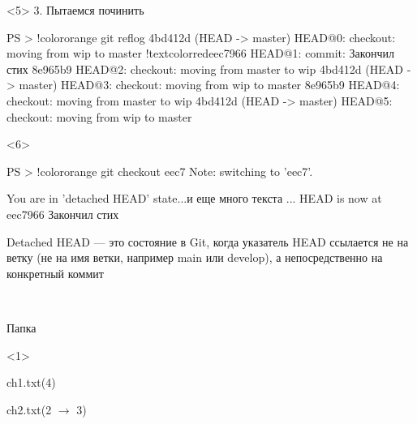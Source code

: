 \documentclass[9pt, aspectratio=1610]{beamer}
\begin{document}
\begin{frame}[t,fragile]
\begin{columns}[onlytextwidth]
\begin{column}[T]{\linewidth}
\begin{minipage}[t][5.2cm][t]{\textwidth}
				\begin{onlyenv}<5>
					3. Пытаемся починить
					
					\begin{VerbatimCmd}[gobble=6]
						
						PS > !color{orange} git reflog
						4bd412d (HEAD -> master) HEAD@{0}: checkout: moving from wip to master
						!textcolor{red}{eec7966} HEAD@{1}: commit: Закончил стих
						8e965b9 HEAD@{2}: checkout: moving from master to wip
						4bd412d (HEAD -> master) HEAD@{3}: checkout: moving from wip to master
						8e965b9 HEAD@{4}: checkout: moving from master to wip
						4bd412d (HEAD -> master) HEAD@{5}: checkout: moving from wip to master
						
					\end{VerbatimCmd}
				\end{onlyenv}
				
				
				\begin{onlyenv}<6>
					
					\begin{VerbatimCmd}[gobble=6]
						
						PS > !color{orange} git checkout eec7  
						Note: switching to 'eec7'.
						
						You are in 'detached HEAD' state...и еще много текста
						...
						HEAD is now at eec7966 Закончил стих
						
					\end{VerbatimCmd}
					
					\begin{alertblock}{Detached HEAD --- }
						это состояние в Git, когда указатель HEAD ссылается не на ветку (не на имя ветки, например main или develop), а непосредственно на конкретный коммит
					\end{alertblock}
				\end{onlyenv}
				
				
				
			\end{minipage}\\
			\begin{minipage}[t][3cm][t]{\linewidth}
				\begin{minipage}[t]{0.29\linewidth}
					\begin{exampleblock}{Папка\strut}  %
						
						\begin{onlyenv}<1>
							\strut ch1.txt(4)
							\strut ch2.txt(2 $\to$ 3)
						\end{onlyenv}
						

\end{exampleblock}
\end{minipage}
\end{minipage}
\end{column}
\end{columns}
\end{frame}
\end{document}
